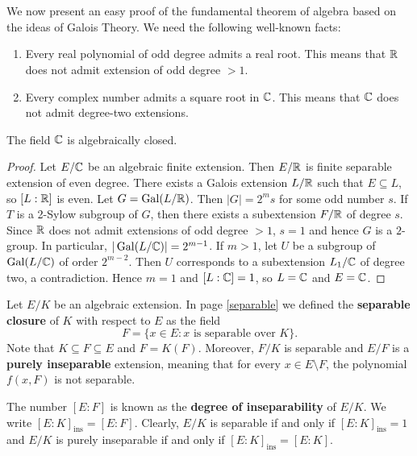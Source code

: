 \chapter{}


We now present an easy proof of the fundamental theorem 
of algebra based on the ideas of Galois Theory. 
We need the following well-known facts:
\begin{enumerate}
\item Every real polynomial of odd degree admits a real root. This means that $\mathbb{R}$ 
does not admit extension of odd degree $>1$. 
\item Every complex number admits a square root in $\mathbb{C}$. This means that $\mathbb{C}$ 
does not admit degree-two extensions.
\end{enumerate}

\begin{theorem}
The field $\mathbb{C}$ is algebraically closed.
\end{theorem}

\begin{proof}
    Let $E/\mathbb{C}$ be an algebraic finite extension. Then $E/\mathbb{R}$ 
    is finite separable extension of even degree. There exists a Galois
    extension 
    $L/\mathbb{R}$ such that $E\subseteq L$, so $[L:\mathbb{R}]$ is even. Let $G=\operatorname{Gal}(L/\mathbb{R})$. 
    Then $|G|=2^ms$ for some odd number $s$. If $T$ is a 2-Sylow subgroup
    of $G$, 
    then there exists a subextension $F/\mathbb{R}$ of degree $s$. Since 
    $\mathbb{R}$ does not admit extensions of odd degree $>1$, $s=1$ and
    hence $G$ is a $2$-group. In particular, $|\operatorname{Gal}(L/\mathbb{C})|=2^{m-1}$. If $m>1$, 
    let $U$ be a subgroup of $\operatorname{Gal}(L/\mathbb{C})$ of order $2^{m-2}$. Then $U$ corresponds 
    to a subextension $L_1/\mathbb{C}$ of degree two, a contradiction. Hence $m=1$ 
    and $[L:\mathbb{C}]=1$, so $L=\mathbb{C}$ and $E=\mathbb{C}$. 
\end{proof}


Let $E/K$ be an algebraic extension. 
In page \ref{separable} we defined the 
\textbf{separable closure} of $K$ with respect to $E$ as 
the field 
\[
    F=\{x\in E:x\text{ is separable over }K\}.
\]
Note that $K\subseteq F\subseteq E$ 
and $F=K(F)$. Moreover, 
$F/K$ is separable and 
$E/F$ is a \textbf{purely inseparable} extension, meaning that
for every $x\in E\setminus F$, the polynomial $f(x,F)$ is not separable. 

The number $[E:F]$ is known as the \textbf{degree of inseparability} of $E/K$. 
We write $[E:K]_{\operatorname{ins}}=[E:F]$.
Clearly, $E/K$ is separable if and only if $[E:K]_{\operatorname{ins}}=1$ and 
$E/K$ is purely inseparable if and only if $[E:K]_{\operatorname{ins}}=[E:K]$. 

